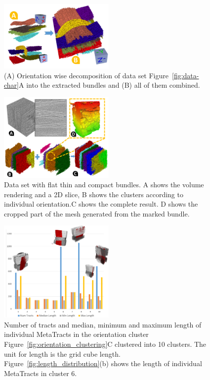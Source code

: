 \begin{figure}[h]
\centering
	\includegraphics[width=0.5\textwidth]{imagesMT2014/all_clusters.PNG}
	\caption{(A) Orientation wise decomposition of data set Figure~\ref{fig:data-char}A into the extracted bundles and (B) all of them combined.}
	\label{fig:crop-16-decomp}
\end{figure}
\begin{figure}
\centering
	\includegraphics[width=0.5\textwidth]{imagesMT2014/crop-6-J.PNG}
	\caption{Data set with flat thin and compact bundles. A shows the volume rendering and a 2D slice, B shows the clusters according to individual orientation.C shows the complete result. D shows the cropped part of the mesh generated from the marked bundle.}
	\label{fig:prepreg}
\end{figure}
\begin{figure}
\centering
	\includegraphics[width=0.5\textwidth]{imagesMT2014/Graph_crop16_2.PNG}
	\caption{Number of tracts and median, minimum and maximum length of individual MetaTracts in the orientation cluster Figure~\ref{fig:orientation_clustering}C clustered into 10 clusters. The unit for length is the grid cube length. Figure~\ref{fig:length_distribution}(b) shows the length of individual MetaTracts in cluster 6.}
	\label{fig:len_dist_crop16}
\end{figure}





